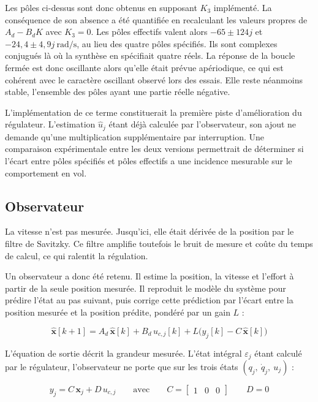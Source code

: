 Les pôles ci-dessus sont donc obtenus en supposant $K_3$ implémenté. La conséquence de son absence a été quantifiée en recalculant les valeurs propres de $A_d - B_d K$ avec $K_3 = 0$. Les pôles effectifs valent alors $-65 \pm 124j$ et $-24{,}4 \pm 4{,}9j\ \mathrm{rad/s}$, au lieu des quatre pôles spécifiés. Ils sont complexes conjugués là où la synthèse en spécifiait quatre réels. La réponse de la boucle fermée est donc oscillante alors qu'elle était prévue apériodique, ce qui est cohérent avec le caractère oscillant observé lors des essais. Elle reste néanmoins stable, l'ensemble des pôles ayant une partie réelle négative.

L'implémentation de ce terme constituerait la première piste d'amélioration du régulateur. L'estimation $\hat u_j$ étant déjà calculée par l'observateur, son ajout ne demande qu'une multiplication supplémentaire par interruption. Une comparaison expérimentale entre les deux versions permettrait de déterminer si l'écart entre pôles spécifiés et pôles effectifs a une incidence mesurable sur le comportement en vol.

\subsection{Observateur}
\label{subsec:observateur}
La vitesse n'est pas mesurée. Jusqu'ici, elle était dérivée de la position par le filtre de Savitzky. Ce filtre amplifie toutefois le bruit de mesure et coûte du temps de calcul, ce qui ralentit la régulation.

Un observateur a donc été retenu. Il estime la position, la vitesse et l'effort à partir de la seule position mesurée. Il reproduit le modèle du système pour prédire l'état au pas suivant, puis corrige cette prédiction par l'écart entre la position mesurée et la position prédite, pondéré par un gain $L$ :

\begin{equation}
    \hat{\boldsymbol x}[k+1] = A_d\,\hat{\boldsymbol x}[k] + B_d\,u_{c,j}[k] + L\bigl(y_j[k] - C\,\hat{\boldsymbol x}[k]\bigr)
\end{equation}

L'équation de sortie décrit la grandeur mesurée. L'état intégral $\varepsilon_j$ étant calculé par le régulateur, l'observateur ne porte que sur les trois états $(q_j,\ \dot q_j,\ u_j)$ :

\begin{equation}
    y_j = C\,\boldsymbol x_j + D\,u_{c,j} \qquad \text{avec} \qquad C = \begin{bmatrix} 1 & 0 & 0 \end{bmatrix} \qquad D = 0
\end{equation}

